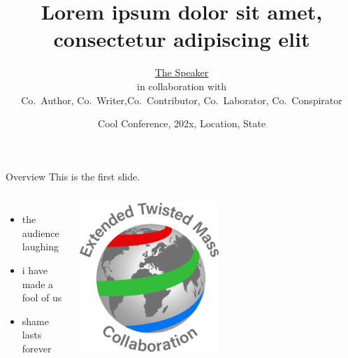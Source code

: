 
\graphicspath{{graphics/}}

\title[Lorem ipsum]{Lorem ipsum dolor sit amet, consectetur adipiscing elit}
\author[T.~Speaker]{\underline{The Speaker} \\ \vspace{0.2cm} in collaboration with \\ \vspace{0.2cm} \centering Co.~Author, Co.~Writer,Co.~Contributor, Co.~Laborator, Co.~Conspirator}
\date[CC'2x, Location, State, 202x]{\small Cool Conference, 202x, Location, State}
\subject{subject}




\begin{frame}
  \titlepage{}
\end{frame}


\begin{frame}{Overview}
  This is the first slide.
  \begin{columns}
      \begin{itemize}
        \item the audience laughing
        \item i have made a fool of us
        \item shame lasts forever
      \end{itemize}
      \centering
      \includegraphics[width=0.5\textwidth]{Logo_ETMC_RGB}
  \end{columns}
\end{frame}

